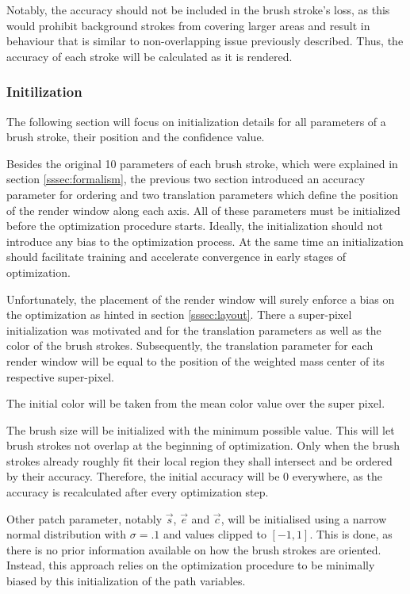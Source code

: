 Notably, the accuracy should not be included in the brush stroke's loss, as this
would prohibit background strokes from covering larger areas and result in behaviour
that is similar to non-overlapping issue previously described.
Thus, the accuracy of each stroke will be calculated as it is rendered.


\subsubsection{Initilization}

The following section will focus on initialization details for all parameters of a
brush stroke, their position and the confidence value.

Besides the original 10 parameters of each brush stroke, which were explained in
section \ref{sssec:formalism}, the previous two section introduced an accuracy
parameter for ordering and two translation parameters which define the position
of the render window along each axis.
All of these parameters must be initialized before the optimization procedure starts.
Ideally, the initialization should not introduce any bias to the optimization process.
At the same time an initialization should facilitate training and accelerate convergence
in early stages of optimization.

Unfortunately, the placement of the render window will surely enforce a bias on the
optimization as hinted in section \ref{sssec:layout}.
There a super-pixel initialization was motivated and for the translation parameters
as well as the color of the brush strokes.
Subsequently, the translation parameter for each render window will be equal to the
position of the weighted mass center of its respective super-pixel.

The initial color will be taken from the mean color value over the super pixel.

The brush size will be initialized with the minimum possible value.
This will let brush strokes not overlap at the beginning of optimization.
Only when the brush strokes already roughly fit their local region they shall intersect
and be ordered by their accuracy.
Therefore, the initial accuracy will be 0 everywhere, as the accuracy is recalculated
after every optimization step.

Other patch parameter, notably $\vec{s}$, $\vec{e}$ and $\vec{c}$, will be initialised
using a narrow normal distribution with $\sigma = .1$ and values clipped to $[-1, 1]$.
This is done, as there is no prior information available on how the brush strokes
are oriented.
Instead, this approach relies on the optimization procedure to be minimally biased
by this initialization of the path variables.

